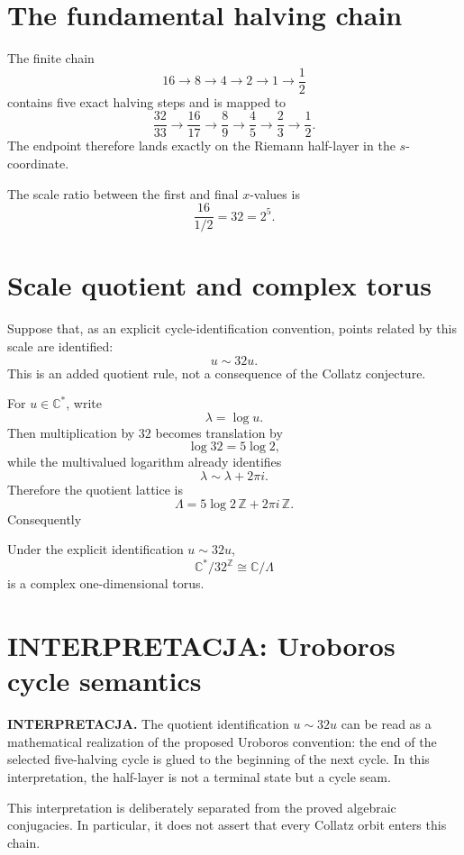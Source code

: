 \section{The fundamental halving chain}

The finite chain
\[
16\to8\to4\to2\to1\to\frac12
\]
contains five exact halving steps and is mapped to
\[
\frac{32}{33}\to\frac{16}{17}\to\frac89\to\frac45\to\frac23\to\frac12.
\]
The endpoint therefore lands exactly on the Riemann half-layer in the \(s\)-coordinate.

The scale ratio between the first and final \(x\)-values is
\[
\frac{16}{1/2}=32=2^5.
\]

\section{Scale quotient and complex torus}

Suppose that, as an explicit cycle-identification convention, points related by this scale are identified:
\[
\boxed{u\sim32u.}
\]
This is an added quotient rule, not a consequence of the Collatz conjecture.

For \(u\in\mathbb C^*\), write
\[
\lambda=\log u.
\]
Then multiplication by \(32\) becomes translation by
\[
\log32=5\log2,
\]
while the multivalued logarithm already identifies
\[
\lambda\sim\lambda+2\pi i.
\]
Therefore the quotient lattice is
\[
\boxed{\Lambda=5\log2\,\mathbb Z+2\pi i\,\mathbb Z.}
\]
Consequently
\begin{theorem}
Under the explicit identification \(u\sim32u\),
\[
\boxed{\mathbb C^*/32^{\mathbb Z}\cong\mathbb C/\Lambda}
\]
is a complex one-dimensional torus.
\end{theorem}

\section{INTERPRETACJA: Uroboros cycle semantics}

\textbf{INTERPRETACJA.} The quotient identification \(u\sim32u\) can be read as a mathematical realization of the proposed Uroboros convention: the end of the selected five-halving cycle is glued to the beginning of the next cycle. In this interpretation, the half-layer is not a terminal state but a cycle seam.

This interpretation is deliberately separated from the proved algebraic conjugacies. In particular, it does not assert that every Collatz orbit enters this chain.

